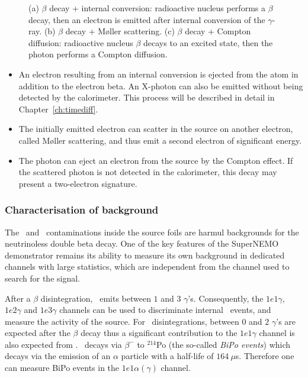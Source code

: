 \begin{figure}[!h]
\begin{subfigure}[t]{0.32\textwidth}
  \captionsetup{justification=justified}
  \caption{
    \label{subfig:int_cont_compton}}
\end{subfigure}
\caption{(a) $\beta$ decay + internal conversion: radioactive nucleus performs a $\beta$ decay, then an electron is emitted after internal conversion of the $\gamma$-ray.
    (b) $\beta$ decay + M\o{}ller scattering.
    (c) $\beta$ decay + Compton diffusion: radioactive nucleus $\beta$ decays to an excited state, then the photon performs a Compton diffusion.
  \label{fig:internal_contamination}}
\end{figure}
\begin{itemize}
\item An electron resulting from an internal conversion is ejected from the atom in addition to the electron  beta.
An X-photon can also be emitted without being detected by the calorimeter.
This process will be described in detail in Chapter~\ref{ch:timediff}.
\item The initially emitted electron can scatter in the source on another electron, called M\o{}ller scattering, and thus emit a second electron of significant energy.
\item The photon can eject an electron from the source by the Compton effect.
If the scattered photon is not detected in the calorimeter, this decay may present a two-electron signature.
\end{itemize}

\subsubsection*{Characterisation of background}

The \Tl\ and \Bi\ contaminations inside the source foils are harmul backgrounds for the neutrinoless double beta decay.
One of the key features of the SuperNEMO demonstrator remains its ability to measure its own background in dedicated channels with large statistics, which are independent from the channel used to search for the signal.

After a $\beta$ disintegration, \Tl\ emits between $1$ and $3$ $\gamma$'s.
Consequently, the $1e1\gamma$, $1e2\gamma$ and $1e3\gamma$ channels can be used to discriminate internal \Tl\ events, and measure the activity of the source.
For \Bi\ disintegrations, between $0$ and $2$ $\gamma$'s are expected after the $\beta$ decay thus a significant contribution to the $1e1\gamma$ channel is also expected from \Bi.
\Bi\ decays via $\beta^{-}$ to $^{214}$Po (the so-called \emph{BiPo events}) which decays via the emission of an $\alpha$ particle with a half-life of $164~\mu$s.
Therefore one can measure BiPo events in the $1e1\alpha(\gamma)$ channel.

